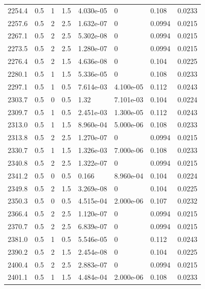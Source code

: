 \documentclass[preview]{standalone}
\begin{document}
{{{{{{{{\begin{tabular}{L{1.2cm}C{1.2cm} C{0.3cm}C{0.5cm} C{1.4cm}C{1.4cm} C{1.4cm}C{1.4cm}}
  2254.4  &   0.5  & 1     & 1.5 &  4.030e-05  & 0  & 0.108 &  0.0233   \\ 
  2257.6  &   0.5  & 2     & 2.5 &  1.632e-07  & 0  & 0.0994 &  0.0215   \\ 
  2267.1  &   0.5  & 2     & 2.5 &  5.302e-08  & 0  & 0.0994 &  0.0215   \\ 
  2273.5  &   0.5  & 2     & 2.5 &  1.280e-07  & 0  & 0.0994 &  0.0215   \\ 
  2276.4  &   0.5  & 2     & 1.5 &  4.636e-08  & 0  & 0.104 &  0.0225   \\ 
  2280.1  &   0.5  & 1     & 1.5 &  5.336e-05  & 0  & 0.108 &  0.0233   \\ 
  2297.1  &   0.5  & 1     & 0.5 &  7.614e-03  & 4.100e-05  & 0.112 &  0.0243   \\ 
  2303.7  &   0.5  & 0     & 0.5 &  1.32  & 7.101e-03  & 0.104 &  0.0224   \\ 
  2309.7  &   0.5  & 1     & 0.5 &  2.451e-03  & 1.300e-05  & 0.112 &  0.0243   \\ 
  2313.0  &   0.5  & 1     & 1.5 &  8.960e-04  & 5.000e-06  & 0.108 &  0.0233   \\ 
  2313.8  &   0.5  & 2     & 2.5 &  1.270e-07  & 0  & 0.0994 &  0.0215   \\ 
  2330.7  &   0.5  & 1     & 1.5 &  1.326e-03  & 7.000e-06  & 0.108 &  0.0233   \\ 
  2340.8  &   0.5  & 2     & 2.5 &  1.322e-07  & 0  & 0.0994 &  0.0215   \\ 
  2341.2  &   0.5  & 0     & 0.5 &  0.166  & 8.960e-04  & 0.104 &  0.0224   \\ 
  2349.8  &   0.5  & 2     & 1.5 &  3.269e-08  & 0  & 0.104 &  0.0225   \\ 
  2350.3  &   0.5  & 0     & 0.5 &  4.515e-04  & 2.000e-06  & 0.107 &  0.0232   \\ 
  2366.4  &   0.5  & 2     & 2.5 &  1.120e-07  & 0  & 0.0994 &  0.0215   \\ 
  2370.7  &   0.5  & 2     & 2.5 &  6.839e-07  & 0  & 0.0994 &  0.0215   \\ 
  2381.0  &   0.5  & 1     & 0.5 &  5.546e-05  & 0  & 0.112 &  0.0243   \\ 
  2390.2  &   0.5  & 2     & 1.5 &  2.454e-08  & 0  & 0.104 &  0.0225   \\ 
  2400.4  &   0.5  & 2     & 2.5 &  2.883e-07  & 0  & 0.0994 &  0.0215   \\ 
  2401.1  &   0.5  & 1     & 1.5 &  4.484e-04  & 2.000e-06  & 0.108 &  0.0233   \\ 

\end{tabular}}}}}}}}}
\end{document}
